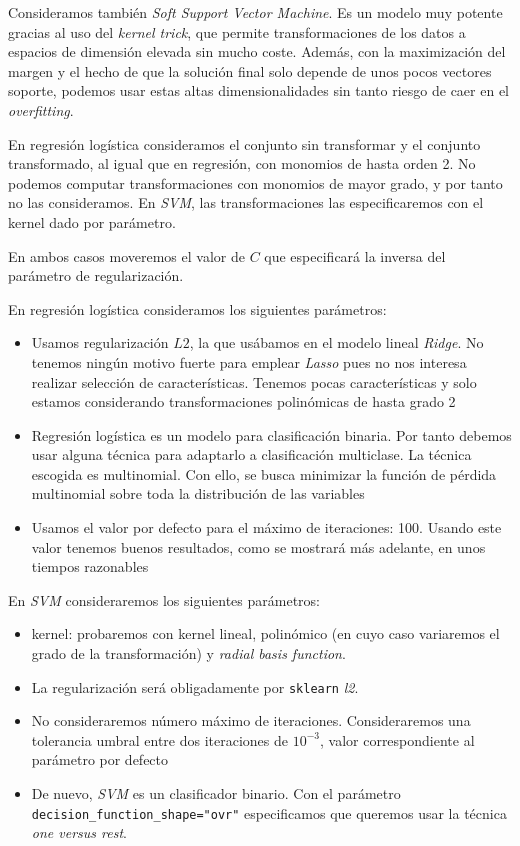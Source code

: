 \documentclass[11pt]{article}
\begin{document}
Consideramos también \emph{Soft Support Vector Machine}. Es un modelo muy potente gracias al uso del \emph{kernel trick}, que permite transformaciones de los datos a espacios de dimensión elevada sin mucho coste. Además, con la maximización del margen y el hecho de que la solución final solo depende de unos pocos vectores soporte, podemos usar estas altas dimensionalidades sin tanto riesgo de caer en el \emph{overfitting}.

En regresión logística consideramos el conjunto sin transformar y el conjunto transformado, al igual que en regresión, con monomios de hasta orden 2. No podemos computar transformaciones con monomios de mayor grado, y por tanto no las consideramos. En \emph{SVM}, las transformaciones las especificaremos con el kernel dado por parámetro.

En ambos casos moveremos el valor de $C$ que especificará la inversa del parámetro de regularización.

En regresión logística consideramos los siguientes parámetros:

\begin{itemize}
    \item Usamos regularización $L2$, la que usábamos en el modelo lineal \emph{Ridge}. No tenemos ningún motivo fuerte para emplear \emph{Lasso} pues no nos interesa realizar selección de características. Tenemos pocas características y solo estamos considerando transformaciones polinómicas de hasta grado 2
    \item Regresión logística es un modelo para clasificación binaria. Por tanto debemos usar alguna técnica para adaptarlo a clasificación multiclase. La técnica escogida es multinomial. Con ello, se busca minimizar la función de pérdida multinomial sobre toda la distribución de las variables \cite{sklearn_lgr:online}
    \item Usamos el valor por defecto para el máximo de iteraciones: 100. Usando este valor tenemos buenos resultados, como se mostrará más adelante, en unos tiempos razonables
\end{itemize}

En \emph{SVM} consideraremos los siguientes parámetros:

\begin{itemize}
    \item kernel: probaremos con kernel lineal, polinómico (en cuyo caso variaremos el grado de la transformación) y  \emph{radial basis function}.
    \item La regularización será obligadamente por \lstinline{sklearn} \emph{l2}.
    \item No consideraremos número máximo de iteraciones. Consideraremos una tolerancia umbral entre dos iteraciones de $10^{-3}$, valor correspondiente al parámetro por defecto
    \item De nuevo, \emph{SVM} es un clasificador binario. Con el parámetro \lstinline{decision_function_shape="ovr"} especificamos que queremos usar la técnica \emph{one versus rest}.
\end{itemize}
\end{document}
